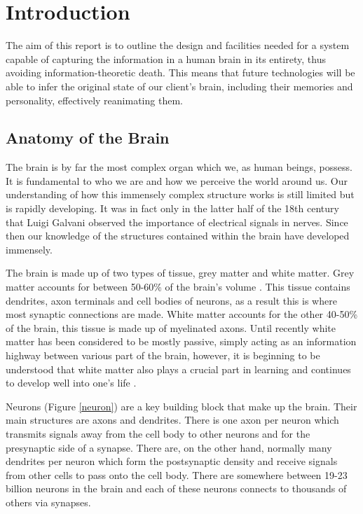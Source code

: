 \documentclass[a4paper, 11pt]{article}
\numberwithin{equation}{section}
\begin{document}
	
	\clearpage
	
	\pagestyle{judah}
\section{Introduction}
\label{intro}
The aim of this report is to outline the design and facilities needed for a system capable of capturing the information in a human brain in its entirety, thus avoiding information-theoretic death. This means that future technologies will be able to infer the original state of our client's brain, including their memories and personality, effectively reanimating them.

\subsection{Anatomy of the Brain}
The brain is by far the most complex organ which we, as human beings, possess. It is fundamental to who we are and how we perceive the world around us. Our understanding of how this immensely complex structure works is still limited but is rapidly developing. It was in fact only in the latter half of the 18th century that Luigi Galvani observed the importance of electrical signals in nerves. Since then our knowledge of the structures contained within the brain have developed immensely.

The brain is made up of two types of tissue, grey matter and white matter. Grey matter accounts for between 50-60\% of the brain's volume \cite{luders2002brain}. This tissue contains dendrites, axon terminals and cell bodies of neurons, as a result this is where most synaptic connections are made. White matter accounts for the other 40-50\% of the brain, this tissue is made up of myelinated axons. Until recently white matter has been considered to be mostly passive, simply acting as an information highway between various part of the brain, however, it is beginning to be understood that white matter also plays a crucial part in learning and continues to develop well into one's life \cite{fields2008white}.

Neurons (Figure \ref{neuron}) are a key building block that make up the brain. Their main structures are axons and dendrites. There is one axon per neuron which transmits signals away from the cell body to other neurons and for the presynaptic side of a synapse. There are, on the other hand, normally many dendrites per neuron which form the postsynaptic density and receive signals from other cells to pass onto the cell body. There are somewhere between 19-23 billion neurons in the brain \cite{parsell2009steven} and each of these neurons connects to thousands of others via synapses. 
\end{document}
